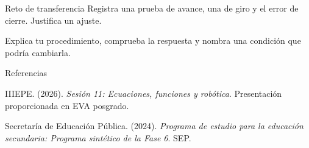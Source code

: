 \documentclass[
	spanish,
	aspectratio=1610,
	xcolor={dvipsnames,table}
]{beamer}
\begin{document}
\begin{frame}{Reto de transferencia}
\fontsize{14}{18}\selectfont Registra una prueba de avance, una de giro y el error de cierre. Justifica un ajuste.\par\vspace{.5cm}Explica tu procedimiento, comprueba la respuesta y nombra una condición que podría cambiarla.
\end{frame}
\begin{frame}{Referencias}
\fontsize{9}{11}\selectfont\raggedright 
{\setlength{\parskip}{6pt}
\par\hangindent=1.27cm  IIIEPE. (2026). \textit{Sesión 11: Ecuaciones, funciones y robótica}. Presentación proporcionada en EVA posgrado.
\par\hangindent=1.27cm  Secretaría de Educación Pública. (2024). \textit{Programa de estudio para la educación secundaria: Programa sintético de la Fase 6}. SEP.
}


\end{frame}
\end{document}
